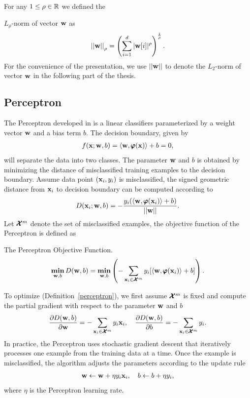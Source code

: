 For any $1\le\rho\in\mathbb{R}$ we defined the {$L_{\rho}$-norm of vector $\mathbf {w}$ as
\begin{align*}
	\left|\left| \mathbf {w} \right|\right|_{\rho} = \left(\sum_{i=1}^{d}|\mathbf {w}[i]|^{\rho}\right)^{\frac{1}{\rho}}.
\end{align*}
For the convenience of the presentation, we use $||\mathbf {w}||$ to denote the $L_2$-norm of vector $\mathbf {w}$ in the following part of the thesis.


%
%
\iffalse
\subsection{Perceptron}\label{sc_perceptron}

The Perceptron developed in \citep{Rosenblatt58,Rosenblatt62} is a linear classifiers parameterized by a weight vector $\mathbf {w}$ and a bias term $b$. 
The decision boundary, given by 
\begin{align*}
	f(\mathbf {x};\mathbf {w},b) = \langle \mathbf {w}, \pmb \varphi(\mathbf {x}) \rangle + b =0,
\end{align*}
will separate the data into two classes.
The parameter $\mathbf {w}$ and $b$ is obtained by minimizing the distance of misclassified training examples to the decision boundary.
Assume data point $(\mathbf {x}_i,y_i)$ is misclassified, the signed geometric distance from $\mathbf {x}_i$ to decision boundary can be computed according to
\begin{align*}
	D(\mathbf {x}_i;\mathbf {w},b) = -\frac{y_i(\langle \mathbf {w}, \pmb \varphi(\mathbf {x}_i) \rangle+b)}{\left|\left| \mathbf {w} \right|\right|}.
\end{align*}
Let $\pmb {\mathcal{X}}^m$ denote the set of misclassified examples, the objective function of the Perceptron is defined as
\begin{definition}{The Perceptron Objective Function.}\label{perceptron}
	\begin{align*}
		\underset{\mathbf {w},b}{\textbf{min}} \, D(\mathbf {w},b) = \underset{\mathbf {w},b}{\textbf{min}} \left( -\sum_{\mathbf {x}_i\in\pmb {\mathcal{X}}^{m}}y_i[\langle \mathbf {w}, \pmb \varphi(\mathbf {x}_i) \rangle+b]\right).
	\end{align*}
\end{definition}
\noindent
To optimize (Definition~\ref{perceptron}), we first assume $\pmb {\mathcal{X}}^{m}$ is fixed and compute the partial gradient with respect to the parameter $\mathbf {w}$ and $b$
\begin{align*}
	\frac{\partial D(\mathbf {w},b)}{\partial\mathbf {w}} = -\sum_{\mathbf {x}_i\in\pmb {\mathcal{X}}^m}{y_i\mathbf {x}_i},\quad
	\frac{\partial D(\mathbf {w},b)}{\partial b} = -\sum_{\mathbf {x}_i\in\pmb {\mathcal{X}}^m}{y_i}.
\end{align*}
In practice, the Perceptron uses stochastic gradient descent that iteratively processes one example from the training data at a time.
Once the example is misclassified, the algorithm adjusts the parameters according to the update rule
\begin{align*}
	\mathbf {w} \leftarrow \mathbf {w} + \eta y_i \mathbf {x}_i, \quad b \leftarrow b + \eta y_i,
\end{align*}
where $\eta$ is the Perceptron learning rate.

}
